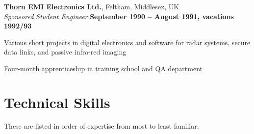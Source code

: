 \documentclass[margin = 0cm,line]{resume}
\begin{document}
\begin{resume}
    \textbf{Thorn EMI Electronics Ltd.}, Feltham, Middlesex, UK \vspace{2mm}\\\vspace{1mm}%
    \textsl{Sponsored Student Engineer} \hfill \textbf{September 1990 -- August 1991, vacations 1992/93}\vspace{-3mm}\\\vspace{-1mm}%
    \begin{list2}
        \item Various short projects in digital electronics and software for radar systems, 
                  secure data links, and passive infra-red imaging
        \item Four-month apprenticeship in training school and QA department
    \end{list2}\vspace{-1.5mm}


    \section{\mysidestyle Technical Skills} 

    These are listed in order of expertise from most to least familiar.


\end{resume}
\end{document}
